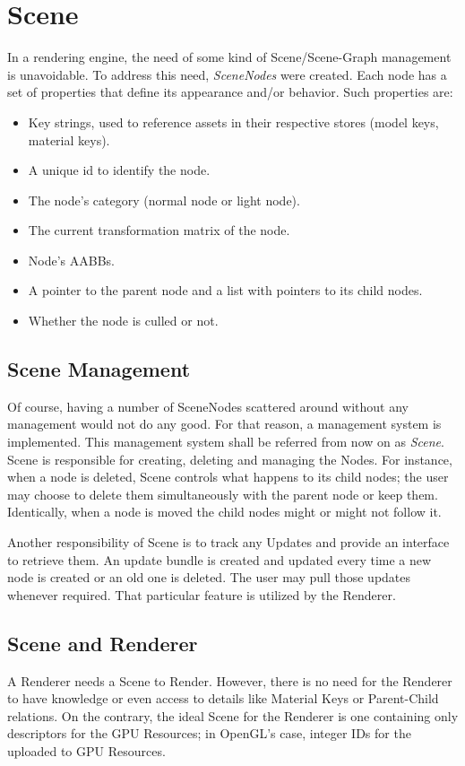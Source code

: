\section{Scene}
In a rendering engine, the need of some kind of Scene/Scene-Graph management is unavoidable. To address this need,
\textit{SceneNodes} were created. Each node has a set of properties that define its appearance and/or behavior.
Such properties are:

\begin{itemize}
\item Key strings, used to reference assets in their respective stores (model keys, material keys).
\item A unique id to identify the node.
\item The node's category (normal node or light node).
\item The current transformation matrix of the node.
\item Node's AABBs.
\item A pointer to the parent node and a list with pointers to its child nodes.
\item Whether the node is culled or not.
\end{itemize}

\subsection{Scene Management}
Of course, having a number of SceneNodes scattered around without any management would not do any good. For that
reason, a management system is implemented. This management system shall be referred from now on as \textit{Scene}.
Scene is responsible for creating, deleting and managing the Nodes. For instance, when a node is deleted, Scene
controls what happens to its child nodes; the user may choose to delete them simultaneously with the parent node or
keep them. Identically, when a node is moved the child nodes might or might not follow it.

Another responsibility of Scene is to track any Updates and provide an interface to retrieve them. An update bundle
is created and updated every time a new node is created or an old one is deleted. The user may pull those updates
whenever required. That particular feature is utilized by the Renderer.

\subsection{Scene and Renderer}
A Renderer needs a Scene to Render. However, there is no need for the Renderer to have knowledge or even access to
details like Material Keys or Parent-Child relations. On the contrary, the ideal Scene for the Renderer is one
containing only descriptors for the GPU Resources; in OpenGL's case, integer IDs for the uploaded to GPU Resources. 

